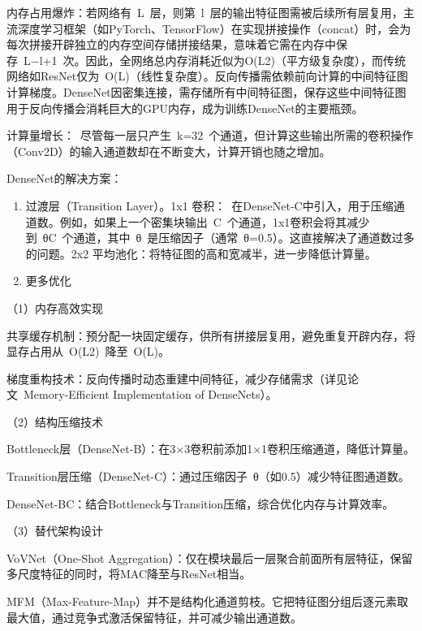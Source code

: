 内存占用爆炸：若网络有~L~层，则第~l~层的输出特征图需被后续所有层复用，主流深度学习框架（如PyTorch、TensorFlow）在实现拼接操作（concat）时，会为每次拼接开辟独立的内存空间存储拼接结果，意味着它需在内存中保存~L−l+1~次。因此，全网络总内存消耗近似为O(L2)（平方级复杂度），而传统网络如ResNet仅为~O(L)（线性复杂度）。反向传播需依赖前向计算的中间特征图计算梯度。DenseNet因密集连接，需存储所有中间特征图，保存这些中间特征图用于反向传播会消耗巨大的GPU内存，成为训练DenseNet的主要瓶颈。

计算量增长：~尽管每一层只产生~k=32~个通道，但计算这些输出所需的卷积操作（Conv2D）的输入通道数却在不断变大，计算开销也随之增加。

DenseNet的解决方案：

\begin{enumerate}
\def\labelenumi{\arabic{enumi}.}
\item
  过渡层（Transition Layer）。1x1 卷积：~在DenseNet-C中引入，用于压缩通道数。例如，如果上一个密集块输出~C~个通道，1x1卷积会将其减少到~θC~个通道，其中~θ~是压缩因子（通常~θ=0.5）。这直接解决了通道数过多的问题。2x2 平均池化：将特征图的高和宽减半，进一步降低计算量。
\item
  更多优化
\end{enumerate}

（1）内存高效实现\hspace{0pt}

共享缓存机制：预分配一块固定缓存，供所有拼接层复用，避免重复开辟内存，将显存占用从~O(L2)~降至~O(L)。

梯度重构技术：反向传播时动态重建中间特征，减少存储需求（详见论文~Memory-Efficient Implementation of DenseNets）。

（2）结构压缩技术\hspace{0pt}

Bottleneck层（DenseNet-B）：在3×3卷积前添加1×1卷积压缩通道，降低计算量。

Transition层压缩（DenseNet-C）：通过压缩因子~θ（如0.5）减少特征图通道数。

DenseNet-BC：结合Bottleneck与Transition压缩，综合优化内存与计算效率。

（3）替代架构设计\hspace{0pt}

VoVNet（One-Shot Aggregation）：仅在模块最后一层聚合前面所有层特征，保留多尺度特征的同时，将MAC降至与ResNet相当。

MFM（Max-Feature-Map）并不是结构化通道剪枝。它把特征图分组后逐元素取最大值，通过竞争式激活保留特征，并可减少输出通道数。

